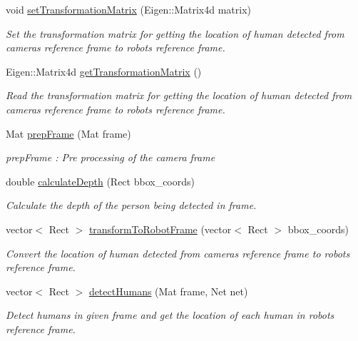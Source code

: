 \begin{DoxyCompactItemize}
void \hyperlink{classRobot_a2362bcfbd845f451a278b3d6af907f1f}{set\+Transformation\+Matrix} (Eigen\+::\+Matrix4d matrix)
\begin{DoxyCompactList}\small\item\em Set the transformation matrix for getting the location of human detected from camera\textquotesingle{}s reference frame to robot\textquotesingle{}s reference frame. \end{DoxyCompactList}\item 
Eigen\+::\+Matrix4d \hyperlink{classRobot_a0034f52a4daac582470860655f38f734}{get\+Transformation\+Matrix} ()
\begin{DoxyCompactList}\small\item\em Read the transformation matrix for getting the location of human detected from camera\textquotesingle{}s reference frame to robot\textquotesingle{}s reference frame. \end{DoxyCompactList}\item 
Mat \hyperlink{classRobot_a16845345490d84f599e5b469eca208dd}{prep\+Frame} (Mat frame)
\begin{DoxyCompactList}\small\item\em prep\+Frame \+: Pre processing of the camera frame \end{DoxyCompactList}\item 
double \hyperlink{classRobot_a7d7c5ba1d9b83dcb6bc6413d7b89c6ff}{calculate\+Depth} (Rect bbox\+\_\+coords)
\begin{DoxyCompactList}\small\item\em Calculate the depth of the person being detected in frame. \end{DoxyCompactList}\item 
vector$<$ Rect $>$ \hyperlink{classRobot_a090b8f765b5d83a322576fb9d48bb14e}{transform\+To\+Robot\+Frame} (vector$<$ Rect $>$ bbox\+\_\+coords)
\begin{DoxyCompactList}\small\item\em Convert the location of human detected from camera\textquotesingle{}s reference frame to robot\textquotesingle{}s reference frame. \end{DoxyCompactList}\item 
vector$<$ Rect $>$ \hyperlink{classRobot_ab98ffeccb3b37392f4336e3a6dd14913}{detect\+Humans} (Mat frame, Net net)
\begin{DoxyCompactList}\small\item\em Detect humans in given frame and get the location of each human in robot\textquotesingle{}s reference frame. \end{DoxyCompactList}\end{DoxyCompactItemize}


